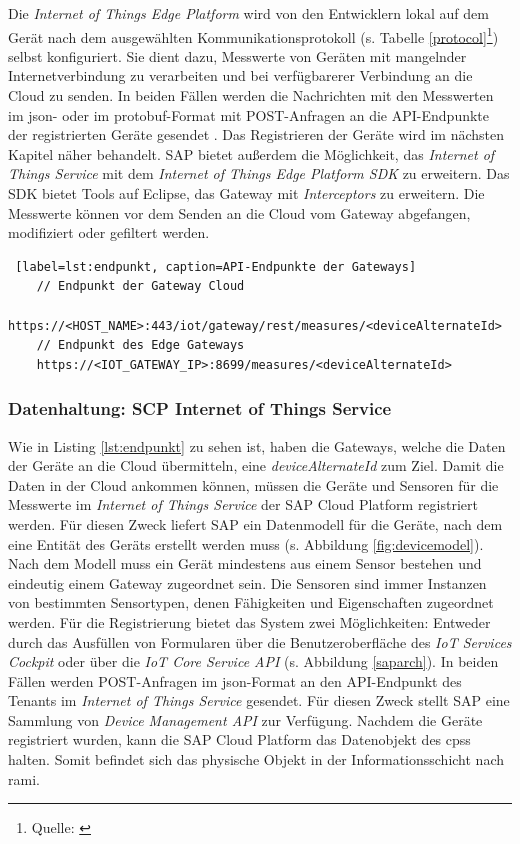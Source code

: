   \noindent Die \textit{Internet of Things Edge Platform} wird von den Entwicklern lokal auf dem Gerät nach dem ausgewählten Kommunikationsprotokoll (s. Tabelle \ref{protocol}\footnote{Quelle: \citet{SAP2020}}) selbst konfiguriert. Sie dient dazu, Messwerte von Geräten mit mangelnder Internetverbindung zu verarbeiten und bei verfügbarerer Verbindung an die Cloud zu senden. In beiden Fällen werden die Nachrichten mit den Messwerten im \ac{json}- oder im \ac{protobuf}-Format mit POST-Anfragen an die API-Endpunkte der registrierten Geräte gesendet \citep{SAP2020}. Das Registrieren der Geräte wird im nächsten Kapitel näher behandelt. SAP bietet außerdem die Möglichkeit, das \textit{Internet of Things Service} mit dem \textit{Internet of Things Edge Platform SDK} zu erweitern. Das SDK bietet Tools auf Eclipse, das Gateway mit \textit{Interceptors} zu erweitern. Die Messwerte können vor dem Senden an die Cloud vom Gateway abgefangen, modifiziert oder gefiltert werden.
\newline
  \begin{lstlisting} [label=lst:endpunkt, caption=API-Endpunkte der Gateways]
    // Endpunkt der Gateway Cloud
    https://<HOST_NAME>:443/iot/gateway/rest/measures/<deviceAlternateId>
    // Endpunkt des Edge Gateways
    https://<IOT_GATEWAY_IP>:8699/measures/<deviceAlternateId>
  \end{lstlisting}



\subsubsection{Datenhaltung: SCP Internet of Things Service} \label{iotcp}

Wie in Listing \ref{lst:endpunkt} zu sehen ist, haben die Gateways, welche die Daten der Geräte an die Cloud übermitteln, eine \textit{deviceAlternateId} zum Ziel. Damit die Daten in der Cloud ankommen können, müssen die Geräte und Sensoren für die Messwerte im \textit{Internet of Things Service} der SAP Cloud Platform registriert werden. Für diesen Zweck liefert SAP ein Datenmodell für die Geräte, nach dem eine Entität des Geräts erstellt werden muss (s. Abbildung \ref{fig:devicemodel}). Nach dem Modell muss ein Gerät mindestens aus einem Sensor bestehen und eindeutig einem Gateway zugeordnet sein. Die Sensoren sind immer Instanzen von bestimmten Sensortypen, denen Fähigkeiten und Eigenschaften zugeordnet werden.
Für die Registrierung bietet das System zwei Möglichkeiten: Entweder durch das Ausfüllen von Formularen über die Benutzeroberfläche des \textit{IoT Services Cockpit} oder über die \textit{IoT Core Service API} (s. Abbildung \ref{saparch}). In beiden Fällen werden POST-Anfragen im \ac{json}-Format an den API-Endpunkt des Tenants im \textit{Internet of Things Service} gesendet. Für diesen Zweck stellt SAP eine Sammlung von \textit{Device Management API} zur Verfügung. Nachdem die Geräte registriert wurden, kann die SAP Cloud Platform das Datenobjekt des \ac{cpss} halten. Somit befindet sich das physische Objekt in der Informationsschicht nach \ac{rami}.

